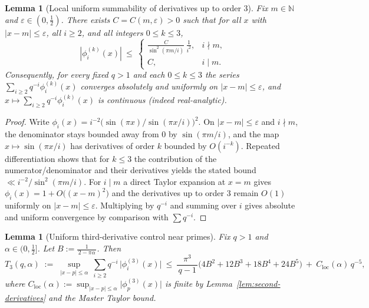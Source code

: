 \documentclass[11pt,a4paper]{amsart}
\theoremstyle{plain}
\newtheorem{lemma}[theorem]{Lemma}
\theoremstyle{definition}
\theoremstyle{remark}
\begin{document}
\begin{lemma}[Local uniform summability of derivatives up to order $3$]\label{lem:uniform-summability}
Fix $m\in\mathbb N$ and $\varepsilon\in(0,\tfrac12)$. There exists $C=C(m,\varepsilon)>0$ such that for all $x$ with $|x-m|\le \varepsilon$, all $i\ge 2$, and all integers $0\le k\le 3$,
\[
|\phi_i^{(k)}(x)|\ \le\
\begin{cases}
\displaystyle \frac{C}{\sin^2(\pi m/i)}\,\frac{1}{i^{2}}, & i\nmid m,\\[1.2ex]
\displaystyle C, & i\mid m.
\end{cases}
\]
Consequently, for every fixed $q>1$ and each $0\le k\le 3$ the series $\sum_{i\ge2} q^{-i}\phi_i^{(k)}(x)$ converges absolutely and uniformly on $|x-m|\le \varepsilon$, and $x\mapsto \sum_{i\ge2} q^{-i}\phi_i^{(k)}(x)$ is continuous (indeed real-analytic).
\end{lemma}
\begin{proof}
Write $\phi_i(x)=i^{-2}\bigl(\sin(\pi x)/\sin(\pi x/i)\bigr)^2$. On $|x-m|\le \varepsilon$ and $i\nmid m$, the denominator stays bounded away from $0$ by $\sin(\pi m/i)$, and the map $x\mapsto \sin(\pi x/i)$ has derivatives of order $k$ bounded by $O(i^{-k})$. Repeated differentiation shows that for $k\le 3$ the contribution of the numerator/denominator and their derivatives yields the stated bound $\ll i^{-2}/\sin^2(\pi m/i)$. For $i\mid m$ a direct Taylor expansion at $x=m$ gives $\phi_i(x)=1+O\big((x-m)^2\big)$ and the derivatives up to order $3$ remain $O(1)$ uniformly on $|x-m|\le \varepsilon$. Multiplying by $q^{-i}$ and summing over $i$ gives absolute and uniform convergence by comparison with $\sum q^{-i}$.
\end{proof}

\begin{lemma}[Uniform third-derivative control near primes]\label{lem:third-derivative-uniform}
Fix $q>1$ and $\alpha\in(0,\tfrac12]$. Let $B:=\frac{1}{\,2-\pi\alpha\,}$. Then
\[
T_3(q,\alpha)\;:=\;\sup_{|x-p|\le \alpha}\ \sum_{i\ge2} q^{-i}\, \big|\phi_i^{(3)}(x)\big|
\ \le\ \frac{\pi^3}{\,q-1\,}\Big(4B^2+12B^3+18B^4+24B^5\Big)\ +\ C_{\mathrm{loc}}(\alpha)\,q^{-5},
\]
where $C_{\mathrm{loc}}(\alpha):=\sup_{|x-p|\le\alpha}\big|\phi_p^{(3)}(x)\big|$ is finite by Lemma~\ref{lem:second-derivatives} and the Master Taylor bound.
\end{lemma}
\end{document}
